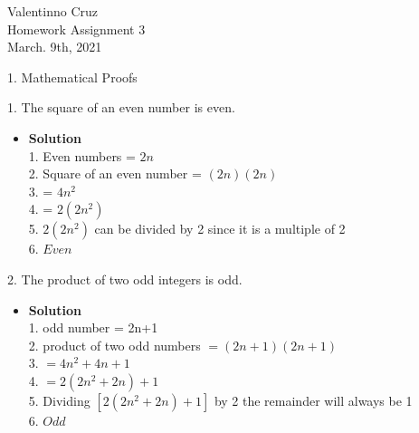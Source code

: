\documentclass[11pt]{article}
\begin{document}
\begin{center}
    {\Large Valentinno Cruz\\
    Homework Assignment 3\\
    March. 9th, 2021\\}

\end{center}



\begin{flushleft}
{\Large 1. Mathematical Proofs}
\end{flushleft}



\begin{enumerate}

\begin{flushleft}
{\large 1. The square of an even number is even.}
\end{flushleft}

\begin{itemize}

\item \textbf{Solution}\\
\large 1. Even numbers = $2n$\\
\large 2. Square of an even number = $(2n)(2n)$\\
\large 3. = $4n^2$\\
\large 4. = $2(2n^2)$\\
\large 5. $2(2n^2)$ can be divided by 2 since it is a multiple of 2\\
\large 6. \therefore \hspace{.2cm} $Even$\\

\end {itemize}
\end {enumerate}


\begin{enumerate}

\begin{flushleft}
{\large 2. The product of two odd integers is odd.}
\end{flushleft}

\begin{itemize}

\item \textbf{Solution}\\
\large 1. odd number = 2n+1\\
\large 2. product of two odd numbers $= (2n+1)(2n+1)$\\
\large 3. $= 4n^2 +4n+1$\\
\large 4. $= 2(2n^2+2n)+1$\\
\large 5. Dividing $ [2(2n^2+2n)+1]$ by 2 the remainder will always be 1\\
\large 6. \therefore \hspace{.2cm} $Odd$\\

\end {itemize}
\end {enumerate}
\end{document}
